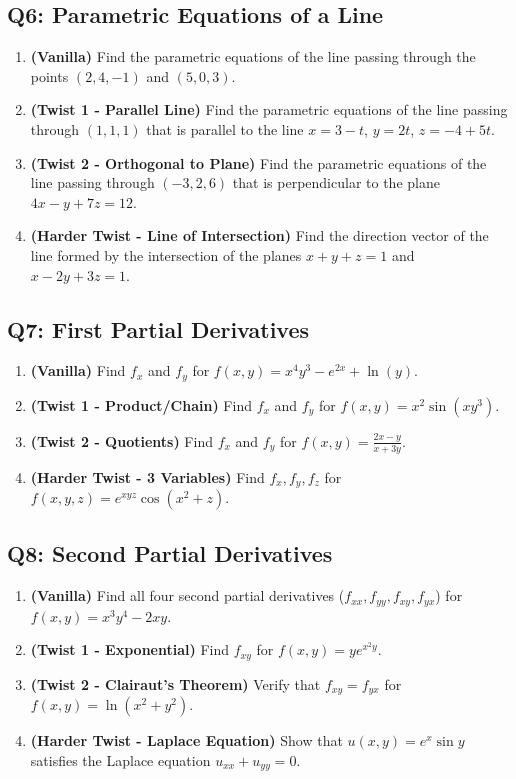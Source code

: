 \documentclass[11pt]{article}
\begin{document}
\subsection{Q6: Parametric Equations of a Line}
\begin{enumerate}[label=\textbf{6\alph*.}]
    \item \textbf{(Vanilla)} Find the parametric equations of the line passing through the points $(2, 4, -1)$ and $(5, 0, 3)$.
    \item \textbf{(Twist 1 - Parallel Line)} Find the parametric equations of the line passing through $(1, 1, 1)$ that is parallel to the line $x = 3-t$, $y = 2t$, $z = -4+5t$.
    \item \textbf{(Twist 2 - Orthogonal to Plane)} Find the parametric equations of the line passing through $(-3, 2, 6)$ that is perpendicular to the plane $4x - y + 7z = 12$.
    \item \textbf{(Harder Twist - Line of Intersection)} Find the direction vector of the line formed by the intersection of the planes $x + y + z = 1$ and $x - 2y + 3z = 1$.
\end{enumerate}

\subsection{Q7: First Partial Derivatives}
\begin{enumerate}[label=\textbf{7\alph*.}]
    \item \textbf{(Vanilla)} Find $f_x$ and $f_y$ for $f(x,y) = x^4 y^3 - e^{2x} + \ln(y)$.
    \item \textbf{(Twist 1 - Product/Chain)} Find $f_x$ and $f_y$ for $f(x,y) = x^2 \sin(xy^3)$.
    \item \textbf{(Twist 2 - Quotients)} Find $f_x$ and $f_y$ for $f(x,y) = \frac{2x - y}{x + 3y}$.
    \item \textbf{(Harder Twist - 3 Variables)} Find $f_x, f_y, f_z$ for $f(x,y,z) = e^{xyz} \cos(x^2 + z)$.
\end{enumerate}

\subsection{Q8: Second Partial Derivatives}
\begin{enumerate}[label=\textbf{8\alph*.}]
    \item \textbf{(Vanilla)} Find all four second partial derivatives ($f_{xx}, f_{yy}, f_{xy}, f_{yx}$) for $f(x,y) = x^3 y^4 - 2xy$.
    \item \textbf{(Twist 1 - Exponential)} Find $f_{xy}$ for $f(x,y) = y e^{x^2y}$.
    \item \textbf{(Twist 2 - Clairaut's Theorem)} Verify that $f_{xy} = f_{yx}$ for $f(x,y) = \ln(x^2 + y^2)$.
    \item \textbf{(Harder Twist - Laplace Equation)} Show that $u(x,y) = e^x \sin y$ satisfies the Laplace equation $u_{xx} + u_{yy} = 0$.
\end{enumerate}
\end{document}

